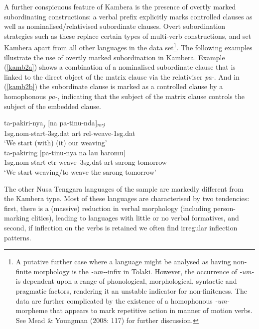 A further conspicuous feature of Kambera is the presence of overtly marked subordinating constructions: a verbal prefix explicitly marks controlled clauses as well as nominalised/relativised subordinate clauses. Overt subordination strategies such as these replace certain types of multi-verb constructions, and set Kambera apart from all other languages in the data set\footnote{A putative further case where a language might be analysed as having non-finite morphology is the \textit{-um-}-infix in Tolaki. However, the occurrence of \textit{-um-} is dependent upon a range of phonological, morphological, syntactic and pragmatic factors, rendering it an unstable indicator for non-finiteness. The data are further complicated by the existence of a homophonous \textit{-um-} morpheme that appears to mark repetitive action in manner of motion verbs. See Mead \& Youngman (2008: 117) for further discussion.}. The following examples illustrate the use of overtly marked subordination in Kambera. Example (\ref{kamb2a}) shows a combination of a nominalised subordinate clause that is linked to the direct object of the matrix clause via the relativiser \textit{pa-}. And in (\ref{kamb2b}) the subordinate clause is marked as a controlled clause by a homophonous \textit{pa-}, indicating that the subject of the matrix clause controls the subject of the embedded clause.

\pex 
\a \label{kamb2a}
\gll ta-pakiri-nya$_j$ $[$na pa-tinu-nda$]_{\textsc{np} \textit{j}}$ \\
\acs{1}\acs{sg}.\acs{nom}-start-\acs{3}\acs{sg}.\acs{dat} \acs{art} \acs{rel}-weave-\acs{1}\acs{sg}.\acs{dat} \\
\glft `We start (with) (it) our weaving' \\ 
\endgl
\a \label{kamb2b}
\gla ta-pakiring $[$pa-tinu-nya na lau haromu$]$ \\ 
\acs{1}\acs{sg}.\acs{nom}-start \acs{ctr}-weave--\acs{3}\acs{sg}.\acs{dat} \acs{art} sarong tomorrow \\
\glft `We start weaving/to weave the sarong tomorrow' \\ 
\endgl
\xe

The other Nusa Tenggara languages of the sample are markedly different from the Kambera type. Most of these languages are characterised by two tendencies: first, there is a (massive) reduction in verbal morphology (including person-marking clitics), leading to languages with little or no verbal formatives, and second, if inflection on the verbs is retained we often find irregular inflection patterns. 

